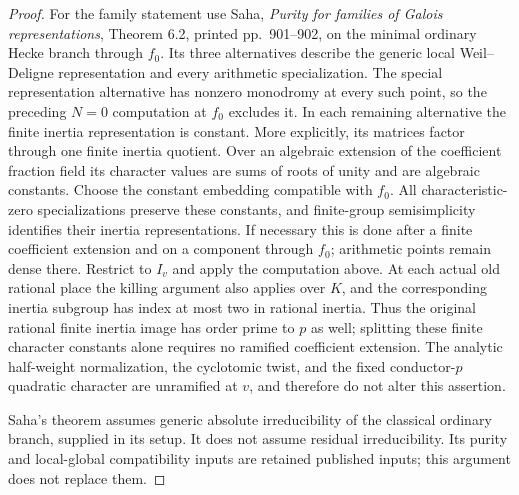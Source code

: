 \begin{proof}
For the family statement use Saha, \emph{Purity for families of Galois
representations}, Theorem 6.2, printed pp.~901--902, on the minimal
ordinary Hecke branch through \(f_0\).  Its three alternatives describe
the generic local Weil--Deligne representation and every arithmetic
specialization.  The special representation alternative has nonzero
monodromy at every such point, so the preceding \(N=0\) computation at
\(f_0\) excludes it.  In each remaining alternative the finite inertia
representation is constant.  More explicitly, its matrices factor
through one finite inertia quotient.  Over an algebraic extension of the
coefficient fraction field its character values are sums of roots of
unity and are algebraic constants.  Choose the constant embedding
compatible with \(f_0\).  All characteristic-zero specializations preserve
these constants, and finite-group semisimplicity identifies their inertia
representations.  If necessary this is done after a finite coefficient
extension and on a component through \(f_0\); arithmetic points remain
dense there.  Restrict to \(I_v\) and apply the computation above.
At each actual old rational place the killing argument also applies
over \(K\), and the corresponding inertia subgroup has index at most
two in rational inertia.  Thus the original rational finite inertia
image has order prime to \(p\) as well; splitting these finite character
constants alone requires no ramified coefficient extension.
The analytic half-weight normalization, the cyclotomic twist, and the
fixed conductor-\(p\) quadratic character are unramified at \(v\), and
therefore do not alter this assertion.

Saha's theorem assumes generic absolute irreducibility of the classical
ordinary branch, supplied in its setup.  It does not assume residual
irreducibility.  Its purity and local-global compatibility inputs are
retained published inputs; this argument does not replace them.
\end{proof}

